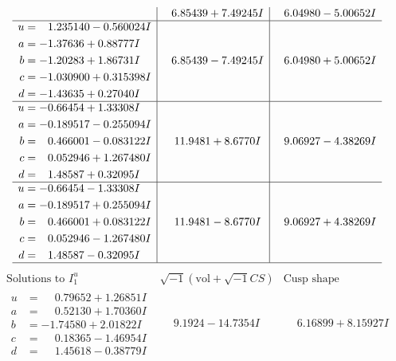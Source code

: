 \documentclass[1p]{elsarticle_modified}
\theoremstyle{definition}
\newcommand{\I}{\sqrt{-1}}
\begin{document}
$$\begin{array}{c|c|c}
 & \phantom{-}6.85439 + 7.49245 I & \phantom{-}6.04980 - 5.00652 I \\ \hline\begin{aligned}
u &= \phantom{-}1.235140 - 0.560024 I \\
a &= -1.37636 + 0.88777 I \\
b &= -1.20283 + 1.86731 I \\
c &= -1.030900 + 0.315398 I \\
d &= -1.43635 + 0.27040 I\end{aligned}
 & \phantom{-}6.85439 - 7.49245 I & \phantom{-}6.04980 + 5.00652 I \\ \hline\begin{aligned}
u &= -0.66454 + 1.33308 I \\
a &= -0.189517 - 0.255094 I \\
b &= \phantom{-}0.466001 - 0.083122 I \\
c &= \phantom{-}0.052946 + 1.267480 I \\
d &= \phantom{-}1.48587 + 0.32095 I\end{aligned}
 & \phantom{-}11.9481 + 8.6770 I & \phantom{-}9.06927 - 4.38269 I \\ \hline\begin{aligned}
u &= -0.66454 - 1.33308 I \\
a &= -0.189517 + 0.255094 I \\
b &= \phantom{-}0.466001 + 0.083122 I \\
c &= \phantom{-}0.052946 - 1.267480 I \\
d &= \phantom{-}1.48587 - 0.32095 I\end{aligned}
 & \phantom{-}11.9481 - 8.6770 I & \phantom{-}9.06927 + 4.38269 I\\
 \hline 
 \end{array}$$\newpage$$\begin{array}{c|c|c}  
\text{Solutions to }I^u_{1}& \I (\text{vol} + \sqrt{-1}CS) & \text{Cusp shape}\\
 \hline 
\begin{aligned}
u &= \phantom{-}0.79652 + 1.26851 I \\
a &= \phantom{-}0.52130 + 1.70360 I \\
b &= -1.74580 + 2.01822 I \\
c &= \phantom{-}0.18365 - 1.46954 I \\
d &= \phantom{-}1.45618 - 0.38779 I\end{aligned}
 & \phantom{-}9.1924 - 14.7354 I & \phantom{-}6.16899 + 8.15927 I \\ \hline\begin{aligned}

\end{aligned}
\end{array}$$
\end{document}
